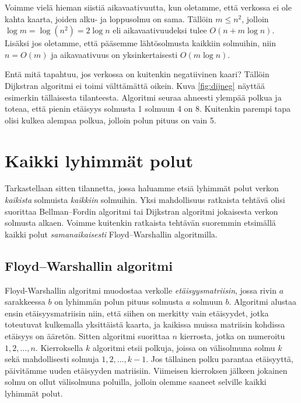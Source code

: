 Voimme vielä hieman siistiä aikavaativuutta, kun oletamme,
että verkossa ei ole kahta kaarta, joiden alku- ja loppusolmu on sama.
Tällöin $m \le n^2$, jolloin $\log m = \log (n^2) = 2 \log n$
eli aikavaativuudeksi tulee $O(n+m \log n)$.
Lisäksi jos oletamme, että pääsemme lähtösolmusta kaikkiin solmuihin,
niin $n=O(m)$ ja aikavaativuus on yksinkertaisesti $O(m \log n)$.

Entä mitä tapahtuu, jos verkossa on kuitenkin negatiivinen kaari?
Tällöin Dijkstran algoritmi ei toimi välttämättä oikein.
Kuva \ref{fig:dijneg} näyttää esimerkin tällaisesta tilanteesta.
Algoritmi seuraa ahneesti ylempää polkua ja toteaa,
että pienin etäisyys solmusta 1 solmuun 4 on 8.
Kuitenkin parempi tapa olisi kulkea alempaa polkua,
jolloin polun pituus on vain 5.

\section{Kaikki lyhimmät polut}

Tarkastellaan sitten tilannetta, jossa haluamme etsiä
lyhimmät polut verkon \emph{kaikista} solmuista
\emph{kaikkiin} solmuihin.
Yksi mahdollisuus ratkaista tehtävä olisi suorittaa Bellman–Fordin algoritmi
tai Dijkstran algoritmi jokaisesta verkon solmusta alkaen.
Voimme kuitenkin ratkaista tehtävän suoremmin
etsimällä kaikki polut \emph{samanaikaisesti}
Floyd–Warshallin algoritmilla.

\subsection{Floyd–Warshallin algoritmi}

Floyd-Warshallin algoritmi muodostaa verkolle \emph{etäisyysmatriisin},
jossa rivin $a$ sarakkeessa $b$ on lyhimmän polun pituus
solmusta $a$ solmuun $b$.
Algoritmi alustaa ensin etäisyysmatriisin niin,
että siihen on merkitty vain etäisyydet,
jotka toteutuvat kulkemalla yksittäistä kaarta,
ja kaikissa muissa matriisin kohdissa etäisyys on ääretön.
Sitten algoritmi suorittaa $n$ kierrosta,
jotka on numeroitu $1,2,\dots,n$.
Kierroksella $k$ algoritmi etsii polkuja, joissa on välisolmuna
solmu $k$ sekä mahdollisesti solmuja $1,2,\dots,k-1$.
Jos tällainen polku parantaa etäisyyttä,
päivitämme uuden etäisyyden matriisiin.
Viimeisen kierroksen jälkeen jokainen solmu on ollut
välisolmuna poluilla, jolloin olemme saaneet selville
kaikki lyhimmät polut.

